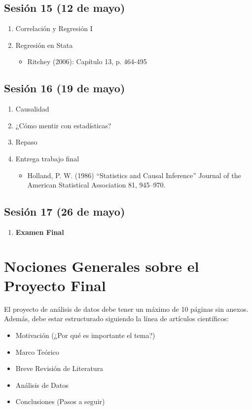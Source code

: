 \documentclass[letterpaper]{article}
\begin{document}
\subsection{Sesión 15 (12 de mayo)}
\begin{enumerate}
		\item Correlación y Regresión I
		\item Regresión en Stata
		\begin{itemize}
			\item Ritchey (2006):
			Capítulo 13, p.
			464-495
		\end{itemize}

\end{enumerate}



\subsection{Sesión 16 (19 de mayo)}
\begin{enumerate}
	\item Causalidad
	\item ¿Cómo mentir con estadísticas?
	\item Repaso
	\item Entrega trabajo final
	\begin{itemize}
		\item Holland, P. W. (1986) “Statistics and Causal Inference” Journal of
		the American Statistical Association 81, 945–970.
	\end{itemize}

\end{enumerate}

\subsection{Sesión 17 (26 de mayo)}
\begin{enumerate}
	\item {\bf Examen Final}
\end{enumerate}

\section{Nociones Generales sobre el Proyecto Final}
El proyecto de análisis de datos debe tener un máximo de 10 páginas sin anexos. Además, debe estar estructurado siguiendo la línea de artículos científicos:
\begin{itemize}
\item Motivación (¿Por qué es importante el tema?)
\item Marco Teórico
\item Breve Revisión de Literatura
\item Análisis de Datos
\item Conclusiones (Pasos a seguir)

\end{itemize}
\end{document}
